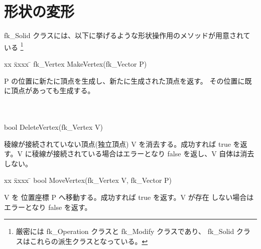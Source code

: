 \section{形状の変形} \label{sec:ModifySolid}
fk\_Solid クラスには、以下に挙げるような形状操作用のメソッドが用意されている
\footnote{厳密には fk\_Operation クラスと fk\_Modify クラスであり、
fk\_Solid クラスはこれらの派生クラスとなっている。}
\begin{tabbing}
xx \= xxxx \= \kill
 \> fk\_Vertex MakeVertex(fk\_Vector P) \\
	\> \> \begin{minipage}[]{15cm}
		P の位置に新たに頂点を生成し、新たに生成された頂点を返す。
		その位置に既に頂点があっても生成する。
	\end{minipage} \\ \\

 \> bool DeleteVertex(fk\_Vertex V) \\
	\> \> \begin{minipage}[]{15cm}
	   	稜線が接続されていない頂点(独立頂点) V を消去する。成功すれば
		true を返す。V に稜線が接続されている場合はエラーとなり false
		を返し、V 自体は消去しない。
	\end{minipage}
\end{tabbing}
\begin{tabbing}
xx \= xxxx \= \kill
 \> bool MoveVertex(fk\_Vertex V, fk\_Vector P) \\
	\> \> \begin{minipage}[]{15cm}
		V を 位置座標 P へ移動する。成功すれば true を返す。V が存在
		しない場合はエラーとなり false を返す。
	\end{minipage}
\end{tabbing}

